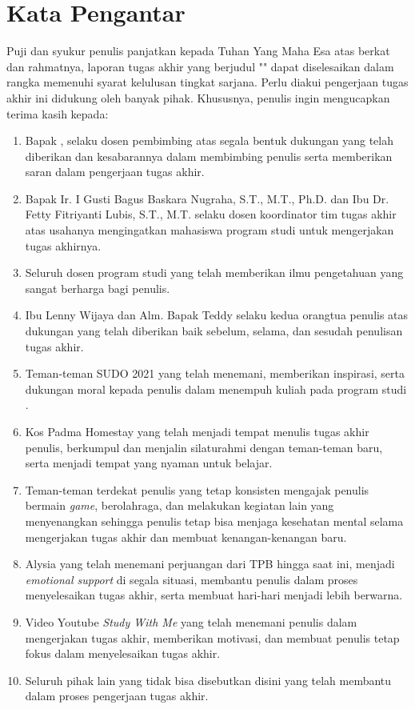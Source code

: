 \chapter*{Kata Pengantar}

Puji dan syukur penulis panjatkan kepada Tuhan Yang Maha Esa atas berkat dan rahmatnya, laporan tugas akhir yang berjudul "\thetitle" dapat diselesaikan dalam rangka memenuhi syarat kelulusan tingkat sarjana. Perlu diakui pengerjaan tugas akhir ini didukung oleh banyak pihak. Khususnya, penulis ingin mengucapkan terima kasih kepada:

\begin{enumerate}
	\item Bapak \namadosbingfull, selaku dosen pembimbing atas segala bentuk dukungan yang telah diberikan dan kesabarannya dalam membimbing penulis serta memberikan saran dalam pengerjaan tugas akhir.
	\item Bapak Ir. I Gusti Bagus Baskara Nugraha, S.T., M.T., Ph.D. dan Ibu Dr. Fetty Fitriyanti Lubis, S.T., M.T.  selaku dosen koordinator tim tugas akhir atas usahanya mengingatkan mahasiswa program studi \stifull{} untuk mengerjakan tugas akhirnya.
	\item Seluruh dosen program studi \stifull{} \itb{} yang telah memberikan ilmu pengetahuan yang sangat berharga bagi penulis.
	\item Ibu Lenny Wijaya dan Alm. Bapak Teddy selaku kedua orangtua penulis atas dukungan yang telah diberikan baik sebelum, selama, dan sesudah penulisan tugas akhir.
	\item Teman-teman SUDO 2021 yang telah menemani, memberikan inspirasi, serta dukungan moral kepada penulis dalam menempuh kuliah pada program studi \stifull.
	\item Kos Padma Homestay yang telah menjadi tempat menulis tugas akhir penulis, berkumpul dan menjalin silaturahmi dengan teman-teman baru, serta menjadi tempat yang nyaman untuk belajar.
	\item Teman-teman terdekat penulis yang tetap konsisten mengajak penulis bermain \textit{game}, berolahraga, dan melakukan kegiatan lain yang menyenangkan sehingga penulis tetap bisa menjaga kesehatan mental selama mengerjakan tugas akhir dan membuat kenangan-kenangan baru.
	\item Alysia yang telah menemani perjuangan dari TPB hingga saat ini, menjadi \textit{emotional support} di segala situasi, membantu penulis dalam proses menyelesaikan tugas akhir, serta membuat hari-hari menjadi lebih berwarna.
	\item Video Youtube \textit{Study With Me} yang telah menemani penulis dalam mengerjakan tugas akhir, memberikan motivasi, dan membuat penulis tetap fokus dalam menyelesaikan tugas akhir.
	\item Seluruh pihak lain yang tidak bisa disebutkan disini yang telah membantu dalam proses pengerjaan tugas akhir.
\end{enumerate}

